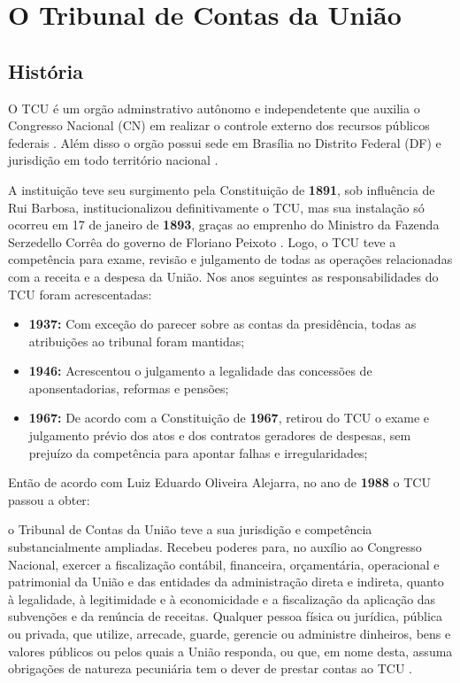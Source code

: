 \chapter[O Tribunal de Contas da União]{O Tribunal de Contas da União}

\section{História}
O TCU é um orgão adminstrativo autônomo e independetente que auxilia o Congresso Nacional (CN) em realizar o controle externo dos recursos públicos federais \cite{TCUHistoria}. Além disso o orgão possui sede em Brasília no Distrito Federal (DF) e jurisdição em todo território nacional \cite{Art73}. 

A instituição teve seu surgimento pela Constituição de \textbf{1891}, sob influência de Rui Barbosa, institucionalizou definitivamente o TCU, mas sua instalação só ocorreu em 17 de janeiro de \textbf{1893}, graças ao emprenho do Ministro da Fazenda Serzedello Corrêa  do governo de Floriano Peixoto \cite{TCUHistoriaJUS}. Logo, o TCU teve a competência para exame, revisão e julgamento de todas as operações relacionadas com a receita e a despesa da União. Nos anos seguintes as responsabilidades do TCU foram acrescentadas\cite{TCUHistoriaJUS}:

\begin{itemize}
	\item \textbf{1937:} Com exceção do parecer sobre as contas da presidência, todas as atribuições ao tribunal foram mantidas;
	
	\item \textbf{1946:} Acrescentou o julgamento a legalidade das concessões de aponsentadorias, reformas e pensões;
	
	\item \textbf{1967:} De acordo com a Constituição de \textbf{1967}, retirou do TCU o exame e julgamento prévio dos atos e dos contratos geradores de despesas, sem prejuízo da competência para apontar falhas e irregularidades; 
\end{itemize}

Então de acordo com Luiz Eduardo Oliveira Alejarra, no ano de \textbf{1988} o TCU passou a obter: 

\begin{citacao}
	o Tribunal de Contas da União teve a sua jurisdição e competência substancialmente ampliadas. Recebeu poderes para, no auxílio ao Congresso Nacional, exercer a fiscalização contábil, financeira, orçamentária, operacional e patrimonial da União e das entidades da administração direta e indireta, quanto à legalidade, à legitimidade e à economicidade e a fiscalização da aplicação das subvenções e da renúncia de receitas. Qualquer pessoa física ou jurídica, pública ou privada, que utilize, arrecade, guarde, gerencie ou administre dinheiros, bens e valores públicos ou pelos quais a União responda, ou que, em nome desta, assuma obrigações de natureza pecuniária tem o dever de prestar contas ao TCU \cite[p. 1]{TCUHistoriaJUS}.
\end{citacao}

